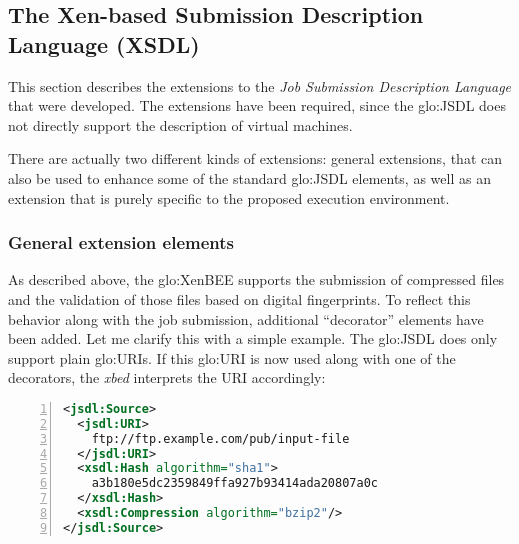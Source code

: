\subsection[The Xen-based Submission Description Language]{The Xen-based Submission Description Language (XSDL)}
\label{sec:xen-based-submission}

This  section  describes  the   extensions  to  the  \emph{Job  Submission
  Description  Language} that  were developed.   The extensions  have been
required,  since   the  \gls{glo:JSDL}  does  not   directly  support  the
description of virtual machines.

There are actually two  different kinds of extensions: general extensions,
that  can also  be used  to enhance  some of  the  standard \gls{glo:JSDL}
elements, as well as an extension  that is purely specific to the proposed
execution environment.

\subsubsection{General extension elements}

As  described  above,  the  \gls{glo:XenBEE} supports  the  submission  of
compressed  files and  the  validation  of those  files  based on  digital
fingerprints.   To reflect this  behavior along  with the  job submission,
additional ``decorator''  elements have been  added.  Let me  clarify this
with  a  simple  example.   The  \gls{glo:JSDL} does  only  support  plain
\gls{glo:URI}s. If  this \gls{glo:URI} is now  used along with  one of the
decorators, the \emph{xbed} interprets the URI accordingly:

\bigskip

\begin{center}
  \begin{minipage}{.75\textwidth}
    \begin{lstlisting}[captionpos=b,backgroundcolor=\color{listingcolor},frame=lines,numbers=left,numberstyle=\tiny,caption={Example
        with the general \texttt{Hash} and \texttt{Compression}
        extensions.},label={lst:xbe-xsdl-example-hash},language=XML]
<jsdl:Source>
  <jsdl:URI>
    ftp://ftp.example.com/pub/input-file
  </jsdl:URI>
  <xsdl:Hash algorithm="sha1">
    a3b180e5dc2359849ffa927b93414ada20807a0c
  </xsdl:Hash>
  <xsdl:Compression algorithm="bzip2"/>
</jsdl:Source>
    \end{lstlisting}
  \end{minipage}
\end{center}


